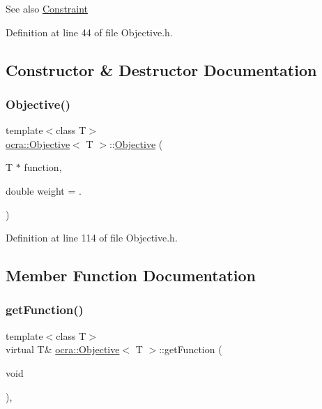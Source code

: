 \begin{DoxySeeAlso}{See also}
\hyperlink{classocra_1_1Constraint}{Constraint} 
\end{DoxySeeAlso}


Definition at line 44 of file Objective.\+h.



\subsection{Constructor \& Destructor Documentation}
\hypertarget{classocra_1_1Objective_a8ece61f7359bcc67cc5a10fde1ddd11d}{}\label{classocra_1_1Objective_a8ece61f7359bcc67cc5a10fde1ddd11d} 
\subsubsection{\texorpdfstring{Objective()}{Objective()}}
{\footnotesize\ttfamily template$<$class T$>$ \\
\hyperlink{classocra_1_1Objective}{ocra\+::\+Objective}$<$ T $>$\+::\hyperlink{classocra_1_1Objective}{Objective} (\begin{DoxyParamCaption}\item[{T $\ast$}]{function,  }\item[{double}]{weight = {.} }\end{DoxyParamCaption})\hspace{0.3cm}{\ttfamily [inline]}}



Definition at line 114 of file Objective.\+h.



\subsection{Member Function Documentation}
\hypertarget{classocra_1_1Objective_acefbb478e0d9ae080ead812eea70e22e}{}\label{classocra_1_1Objective_acefbb478e0d9ae080ead812eea70e22e} 
\subsubsection{\texorpdfstring{get\+Function()}{getFunction()}\hspace{0.1cm}{\footnotesize\ttfamily [1/2]}}
{\footnotesize\ttfamily template$<$class T$>$ \\
virtual T\& \hyperlink{classocra_1_1Objective}{ocra\+::\+Objective}$<$ T $>$\+::get\+Function (\begin{DoxyParamCaption}\item[{void}]{ }\end{DoxyParamCaption})\hspace{0.3cm}{\ttfamily [inline]}, {\ttfamily [virtual]}}

